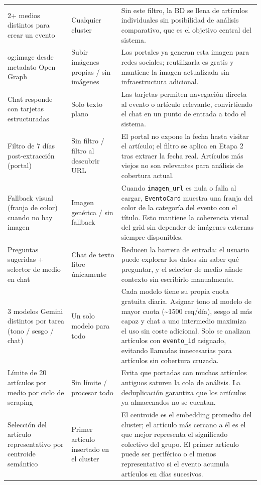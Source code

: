 \documentclass[12pt,a4paper]{article}
\begin{document}
\begin{table}[h]
\begin{tabular}{@{}p{4.2cm}p{3.5cm}p{5.5cm}@{}}
\rowcolor{grisCelda}
2+ medios distintos para crear un evento
  & Cualquier cluster
  & Sin este filtro, la BD se llena de artículos individuales sin posibilidad de análisis comparativo, que es el objetivo central del sistema. \\
og:image desde metadato Open Graph
  & Subir imágenes propias / sin imágenes
  & Los portales ya generan esta imagen para redes sociales; reutilizarla es gratis y mantiene la imagen actualizada sin infraestructura adicional. \\
\rowcolor{grisCelda}
Chat responde con tarjetas estructuradas
  & Solo texto plano
  & Las tarjetas permiten navegación directa al evento o artículo relevante, convirtiendo el chat en un punto de entrada a todo el sistema. \\
\rowcolor{grisCelda}
Filtro de 7 días post-extracción (portal)
  & Sin filtro / filtro al descubrir URL
  & El portal no expone la fecha hasta visitar el artículo; el filtro se aplica en Etapa 2 tras extraer la fecha real. Artículos más viejos no son relevantes para análisis de cobertura actual. \\
\rowcolor{grisCelda}
Fallback visual (franja de color) cuando no hay imagen
  & Imagen genérica / sin fallback
  & Cuando \texttt{imagen\_url} es nula o falla al cargar, \texttt{EventoCard} muestra una franja del color de la categoría del evento con el título. Esto mantiene la coherencia visual del grid sin depender de imágenes externas siempre disponibles. \\
Preguntas sugeridas + selector de medio en chat
  & Chat de texto libre únicamente
  & Reducen la barrera de entrada: el usuario puede explorar los datos sin saber qué preguntar, y el selector de medio añade contexto sin escribirlo manualmente. \\
\rowcolor{grisCelda}
3 modelos Gemini distintos por tarea (tono / sesgo / chat)
  & Un solo modelo para todo
  & Cada modelo tiene su propia cuota gratuita diaria. Asignar tono al modelo de mayor cuota (\textasciitilde{}1500 req/día), sesgo al más capaz y chat a uno intermedio maximiza el uso sin coste adicional. Solo se analizan artículos con \texttt{evento\_id} asignado, evitando llamadas innecesarias para artículos sin cobertura cruzada. \\
Límite de 20 artículos por medio por ciclo de scraping
  & Sin límite / procesar todo
  & Evita que portadas con muchos artículos antiguos saturen la cola de análisis. La deduplicación garantiza que los artículos ya almacenados no se cuentan. \\
Selección del artículo representativo por centroide semántico
  & Primer artículo insertado en el cluster
  & El centroide es el embedding promedio del cluster; el artículo más cercano a él es el que mejor representa el significado colectivo del grupo. El primer artículo puede ser periférico o el menos representativo si el evento acumula artículos en días sucesivos. \\
\bottomrule
\end{tabular}
\label{tab:decisiones}
\end{table}
\end{document}
